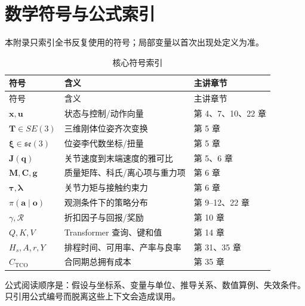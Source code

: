 \chapter{数学符号与公式索引}
\label{app:symbols-formulas}

本附录只索引全书反复使用的符号；局部变量以首次出现处定义为准。

\begin{longtable}{p{}p{}p{}}
\caption{核心符号索引}\label{tab:core-symbols}\\
\toprule
符号 & 含义 & 主讲章节 \\
\midrule\endfirsthead
\toprule 符号 & 含义 & 主讲章节 \\
\midrule\endhead
$\mathbf{x},\mathbf{u}$ & 状态与控制/动作向量 & 第 4、7、10、22 章 \\
$\mathbf{T}\in SE(3)$ & 三维刚体位姿齐次变换 & 第 5 章 \\
$\boldsymbol{\xi}\in\mathfrak{se}(3)$ & 位姿李代数坐标/扭量 & 第 5 章 \\
$\mathbf{J}(\mathbf{q})$ & 关节速度到末端速度的雅可比 & 第 5、6 章 \\
$\mathbf{M},\mathbf{C},\mathbf{g}$ & 质量矩阵、科氏/离心项与重力项 & 第 6 章 \\
$\boldsymbol{\tau},\boldsymbol{\lambda}$ & 关节力矩与接触约束力 & 第 6 章 \\
$\pi(\mathbf{a}\mid\mathbf{o})$ & 观测条件下的策略分布 & 第 9--12、22 章 \\
$\gamma,\mathcal{R}$ & 折扣因子与回报/奖励 & 第 10 章 \\
$Q,K,V$ & Transformer 查询、键和值 & 第 14 章 \\
$H_s,A,r,Y$ & 排程时间、可用率、产率与良率 & 第 31、35 章 \\
$C_{\mathrm{TCO}}$ & 合同期总拥有成本 & 第 35 章 \\
\bottomrule
\end{longtable}

公式阅读顺序是：假设与坐标系、变量与单位、推导关系、数值算例、失效条件。只引用公式编号而脱离这些上下文会造成误用。

